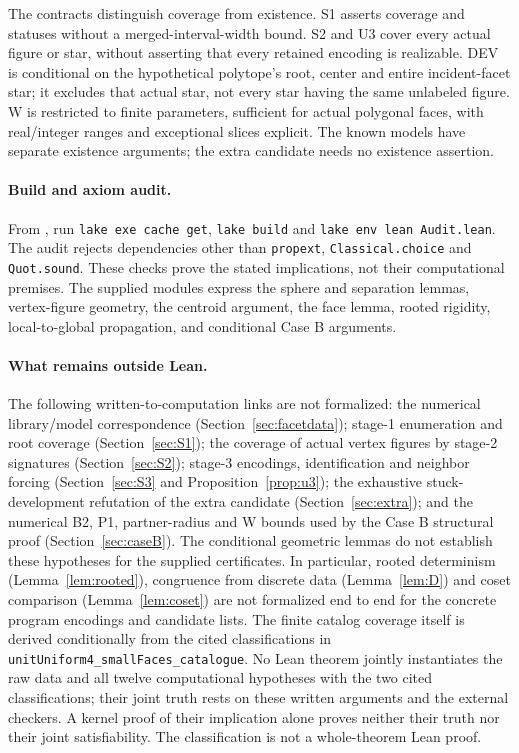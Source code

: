 \documentclass[11pt]{article}
\theoremstyle{definition}
\theoremstyle{remark}
\newcommand{\file}[1]{\path{#1}}
\begin{document}
The contracts distinguish coverage from existence. S1 asserts coverage
and statuses without a merged-interval-width bound. S2 and U3 cover every
actual figure or star, without asserting that every retained encoding is
realizable. DEV is conditional on the hypothetical polytope's root,
center and entire incident-facet star; it excludes that actual star, not
every star having the same unlabeled figure. W is restricted to finite
parameters, sufficient for actual polygonal faces, with real/integer
ranges and exceptional slices explicit. The known models have separate
existence arguments; the extra candidate needs no existence assertion.

\paragraph{Build and axiom audit.}
From \file{lean/}, run \texttt{lake exe cache get}, \texttt{lake build}
and \texttt{lake env lean Audit.lean}. The audit rejects dependencies
other than \texttt{propext}, \texttt{Classical.choice} and \texttt{Quot.sound}.
These checks prove the stated implications, not their computational premises.
The supplied modules express the sphere and separation lemmas,
vertex-figure geometry, the centroid argument, the face lemma, rooted
rigidity, local-to-global propagation, and conditional Case B arguments.

\paragraph{What remains outside Lean.}
The following written-to-computation links are not formalized:
the numerical library/model correspondence
(Section~\ref{sec:facetdata}); stage-1 enumeration
and root coverage (Section~\ref{sec:S1}); the coverage of actual vertex
figures by stage-2 signatures (Section~\ref{sec:S2}); stage-3 encodings,
identification and neighbor forcing (Section~\ref{sec:S3} and
Proposition~\ref{prop:u3}); the exhaustive stuck-development refutation
of the extra candidate (Section~\ref{sec:extra}); and the numerical
B2, P1, partner-radius and W bounds used by the Case B structural proof
(Section~\ref{sec:caseB}). The conditional geometric lemmas do not
establish these hypotheses for the supplied certificates.
In particular, rooted determinism (Lemma~\ref{lem:rooted}), congruence
from discrete data (Lemma~\ref{lem:D}) and coset comparison
(Lemma~\ref{lem:coset}) are not formalized end to end for the concrete
program encodings and candidate lists. The finite catalog coverage itself
is derived conditionally from the cited classifications in
\texttt{unitUniform4\_smallFaces\_catalogue}.
No Lean theorem jointly instantiates the raw data and all twelve
computational hypotheses with the two cited classifications; their joint
truth rests on these written arguments and the external checkers.
A kernel proof of their implication alone proves neither their truth nor
their joint satisfiability. The classification is not a whole-theorem Lean proof.
\end{document}
